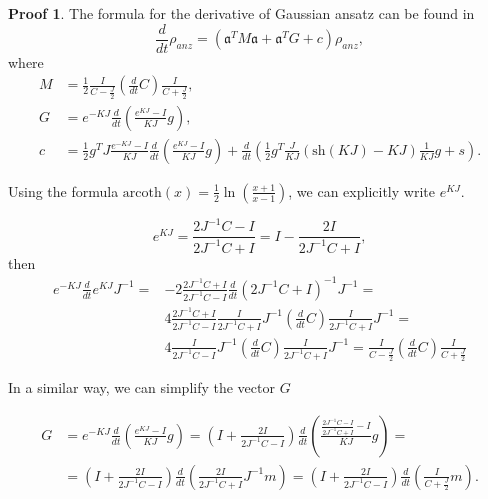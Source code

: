 \documentclass[12pt]{article}
\theoremstyle{definition}
\newtheorem*{demo}{Proof}
\newcommand{\mf}[1]{\mathfrak{#1}}
\begin{document}
	\begin{demo}
		The formula for the derivative of Gaussian ansatz can be found in \cite{Dis}
		\begin{equation}
			\frac{d}{dt}\rho_{anz} = (\mf{a}^TM\mf{a} + \mf{a}^TG + c)\rho_{anz},
		\end{equation}
		where
		\begin{align*}
			M &= \frac{1}{2}\frac{I}{C - \frac{J}{2}}\left(\frac{d}{dt}C\right)\frac{I}{C + \frac{J}{2}},\\
			G &= e^{-KJ}\frac{d}{dt}\left(\frac{e^{KJ} - I}{KJ}g\right),\\
			c &= \frac{1}{2}g^TJ\frac{e^{-KJ} - I}{KJ}\frac{d}{dt}\left( \frac{e^{KJ} - I}{KJ}g  \right) + \frac{d}{dt}\left(  \frac{1}{2}g^T\frac{J}{KJ}(\text{sh}(KJ) - KJ)\frac{1}{KJ}g  +s \right).
		\end{align*}
		
		
		Using the formula $\text{arcoth}(x) = \frac{1}{2}\ln\left(\frac{x + 1}{x - 1}\right)$, we can explicitly write $e^{KJ}$.
		
		\begin{equation*}
			e^{KJ} = \frac{2J^{-1}C - I}{2J^{-1}C + I} = I - \frac{2I}{2J^{-1}C + I},
		\end{equation*}
		then
		\begin{align*}
			e^{-KJ}\frac{d}{dt}e^{KJ}J^{-1} =& -2\frac{2J^{-1}C + I}{2J^{-1}C - I}\frac{d}{dt}(2J^{-1}C + I)^{-1}J^{-1} = \\
			&4 \frac{2J^{-1}C + I}{2J^{-1}C - I} \frac{I}{2J^{-1}C + I}J^{-1}\left(\frac{d}{dt}C\right)\frac{I}{2J^{-1}C + I}J^{-1} = \\
			& 4 \frac{I}{2J^{-1}C - I}J^{-1}\left(\frac{d}{dt}C\right)\frac{I}{2J^{-1}C + I}J^{-1} = \frac{I}{C - \frac{J}{2}}\left(\frac{d}{dt}C\right)\frac{I}{C + \frac{J}{2}}
		\end{align*}
		
		In a similar way, we can simplify the vector $G$
		
		\begin{align*}
			G &= e^{-KJ}\frac{d}{dt}\left(\frac{e^{KJ} - I}{KJ}g\right) = \left(  I + \frac{2I}{2J^{-1}C - I}  \right)\frac{d}{dt}\left( \frac{
				\frac{2J^{-1}C - I}{2J^{-1}C + I} - I}{KJ}   g  \right) =\nonumber\\
			& = \left(  I + \frac{2I}{2J^{-1}C - I}  \right)\frac{d}{dt}\left( \frac{2I}{2J^{-1}C + I} J^{-1}m  \right) = \left(  I + \frac{2I}{2J^{-1}C - I}  \right)\frac{d}{dt}\left(\frac{I}{C + \frac{J}{2}}m\right).
		\end{align*}
		

\end{demo}
\end{document}
